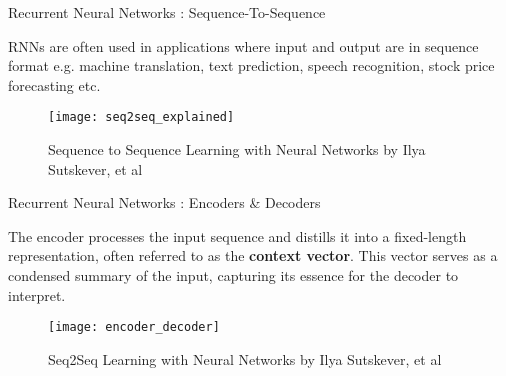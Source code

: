 \documentclass[10pt]{beamer}
\begin{document}
\begin{frame}[fragile]{Recurrent Neural Networks : Sequence-To-Sequence}

	RNNs are often used in applications where input and output are in sequence format e.g. machine translation, text
	prediction, speech recognition, stock price forecasting etc.

	\begin{figure}[h]
		\centering
		\texttt{[image: seq2seq\_explained]}
		\caption{Sequence to Sequence Learning with Neural Networks by Ilya Sutskever, et al}
	\end{figure}

\end{frame}

\begin{frame}[fragile]{Recurrent Neural Networks : Encoders \& Decoders}

	The encoder processes the input sequence and distills it into a fixed-length representation, often referred to
	as the \textbf{context vector}. This vector serves as a condensed summary of the input, capturing its essence
	for the decoder to interpret.


	\begin{figure}[h]
		\centering
		\texttt{[image: encoder\_decoder]}
		\caption{Seq2Seq Learning with Neural Networks by Ilya Sutskever, et al}
	\end{figure}

\end{frame}
\end{document}
